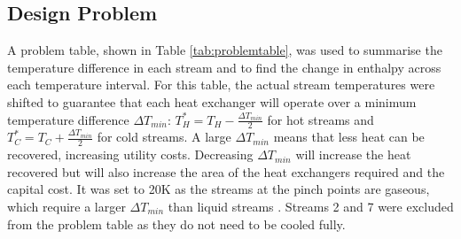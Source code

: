 \subsection{Design Problem} \label{ssec:utility}

A problem table, shown in Table \ref{tab:problemtable}, was used to summarise the temperature difference in each stream and to find the change in enthalpy across each temperature interval. For this table, the actual stream temperatures were shifted to guarantee that each heat exchanger will operate over a minimum temperature difference $\Delta T_{min}$: $T_H^* = T_H - \frac{\Delta T_{min}}{2}$ for hot streams and $T_C^* = T_C + \frac{\Delta T_{min}}{2}$ for cold streams. A large $\Delta T_{min}$ means that less heat can be recovered, increasing utility costs. Decreasing $\Delta T_{min}$ will increase the heat recovered but will also increase the area of the heat exchangers required and the capital cost. It was set to 20K as the streams at the pinch points are gaseous, which require a larger $\Delta T_{min}$ than liquid streams \cite{hexbook}. Streams 2 and 7 were excluded from the problem table as they do not need to be cooled fully.

